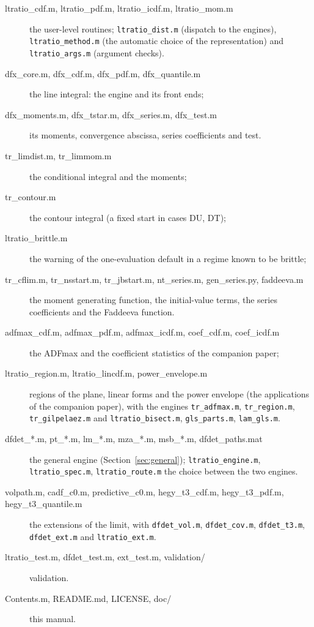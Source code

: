 \documentclass[11pt]{article}
\newcommand{\code}[1]{\texttt{#1}}
\newcommand{\Fu}{\textsf{DU}}
\newcommand{\Ft}{\textsf{DT}}
\begin{document}
\begin{description}
\item[ltratio\_cdf.m, ltratio\_pdf.m, ltratio\_icdf.m, ltratio\_mom.m] the user-level routines; \code{ltratio\_dist.m} (dispatch to the engines), \code{ltratio\_method.m} (the automatic choice of the representation) and \code{ltratio\_args.m} (argument checks).
\item[dfx\_core.m, dfx\_cdf.m, dfx\_pdf.m, dfx\_quantile.m] the line integral: the engine and its front ends;
\item[dfx\_moments.m, dfx\_tstar.m, dfx\_series.m, dfx\_test.m] its moments, convergence abscissa, series coefficients and test.
\item[tr\_limdist.m, tr\_limmom.m] the conditional integral and the moments;
\item[tr\_contour.m] the contour integral (a fixed start in cases \Fu, \Ft);
\item[ltratio\_brittle.m] the warning of the one-evaluation default in a regime known to be brittle;
\item[tr\_cflim.m, tr\_nsstart.m, tr\_jbstart.m, nt\_series.m, gen\_series.py, faddeeva.m] the moment generating function, the initial-value terms, the series coefficients and the Faddeeva function.
\item[adfmax\_cdf.m, adfmax\_pdf.m, adfmax\_icdf.m, coef\_cdf.m, coef\_icdf.m] the ADFmax and the coefficient statistics of the companion paper;
\item[ltratio\_region.m, ltratio\_lincdf.m, power\_envelope.m] regions of the plane, linear forms and the power envelope (the applications of the companion paper), with the engines \code{tr\_adfmax.m}, \code{tr\_region.m}, \code{tr\_gilpelaez.m} and \code{ltratio\_bisect.m}, \code{gls\_parts.m}, \code{lam\_gls.m}.
\item[dfdet\_*.m, pt\_*.m, lm\_*.m, mza\_*.m, msb\_*.m, dfdet\_paths.mat] the general engine (Section~\ref{sec:general}); \code{ltratio\_engine.m}, \code{ltratio\_spec.m}, \code{ltratio\_route.m} the choice between the two engines.
\item[volpath.m, cadf\_c0.m, predictive\_c0.m, hegy\_t3\_cdf.m, hegy\_t3\_pdf.m, hegy\_t3\_quantile.m] the extensions of the limit, with \code{dfdet\_vol.m}, \code{dfdet\_cov.m}, \code{dfdet\_t3.m}, \code{dfdet\_ext.m} and \code{ltratio\_ext.m}.
\item[ltratio\_test.m, dfdet\_test.m, ext\_test.m, validation/] validation.
\item[Contents.m, README.md, LICENSE, doc/] this manual.
\end{description}
\end{document}

